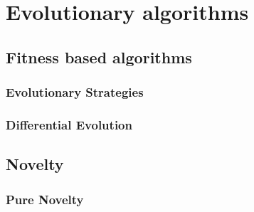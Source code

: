 \chapter{Evolutionary algorithms}

\section{Fitness based algorithms}

\subsection{Evolutionary Strategies}
\subsection{Differential Evolution}
\section{Novelty}
\subsection{Pure Novelty}

